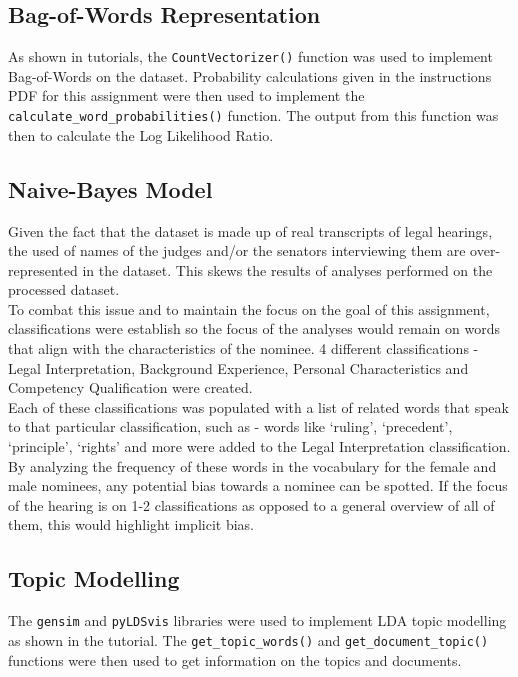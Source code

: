 \documentclass[titlepage]{article}
\begin{document}
\subsection{Bag-of-Words Representation}
As shown in tutorials, the \texttt{CountVectorizer()} function was used to implement Bag-of-Words on the dataset.
Probability calculations given in the instructions PDF for this assignment were then used to implement the 
\texttt{calculate\_word\_probabilities()} function. The output from this function was then to calculate the 
Log Likelihood Ratio. 

\subsection{Naive-Bayes Model}

Given the fact that the dataset is made up of real transcripts of legal hearings, the used of names of the judges and/or
the senators interviewing them are over-represented in the dataset. This skews the results of analyses performed 
on the processed dataset. \\

To combat this issue and to maintain the focus on the goal of this assignment, classifications were establish so the focus of 
the analyses would remain on words that align with the characteristics of the nominee. 4 different classifications - 
Legal Interpretation, Background Experience, Personal Characteristics and Competency Qualification were created. \\

Each of these classifications was populated with a list of related words that speak to that particular classification, such as - 
words like `ruling', `precedent', `principle', `rights' and more were added to the Legal Interpretation classification. By analyzing the 
frequency of these words in the vocabulary for the female and male nominees, any potential bias towards a nominee can be spotted. If 
the focus of the hearing is on 1-2 classifications as opposed to a general overview of all of them, this would highlight implicit bias.

\subsection{Topic Modelling}
The \texttt{gensim} and \texttt{pyLDSvis} libraries were used to implement LDA topic modelling as shown in the tutorial. 
The \texttt{get\_topic\_words()} and \texttt{get\_document\_topic()} functions were then used to get information on the topics and 
documents.  
\end{document}
